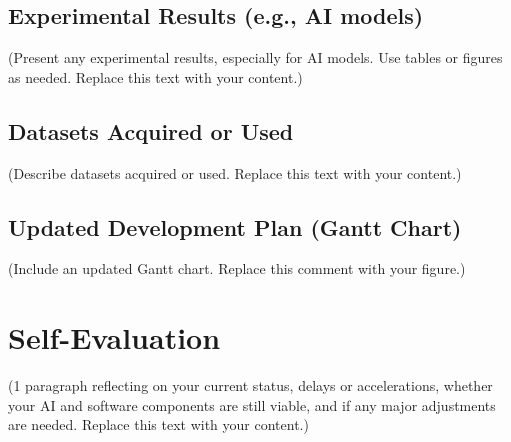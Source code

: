 \subsection*{Experimental Results (e.g., AI models)}
\label{subsec:progress_experimental_results}
(Present any experimental results, especially for AI models. Use tables or figures as needed. Replace this text with your content.)

\subsection*{Datasets Acquired or Used}
\label{subsec:progress_datasets}
(Describe datasets acquired or used. Replace this text with your content.)

\subsection*{Updated Development Plan (Gantt Chart)}
\label{subsec:progress_updated_plan}
(Include an updated Gantt chart. Replace this comment with your figure.)

\section*{Self-Evaluation}
\label{sec:progress_self_evaluation}
(1 paragraph reflecting on your current status, delays or accelerations, whether your AI and software components are still viable, and if any major adjustments are needed. Replace this text with your content.)

